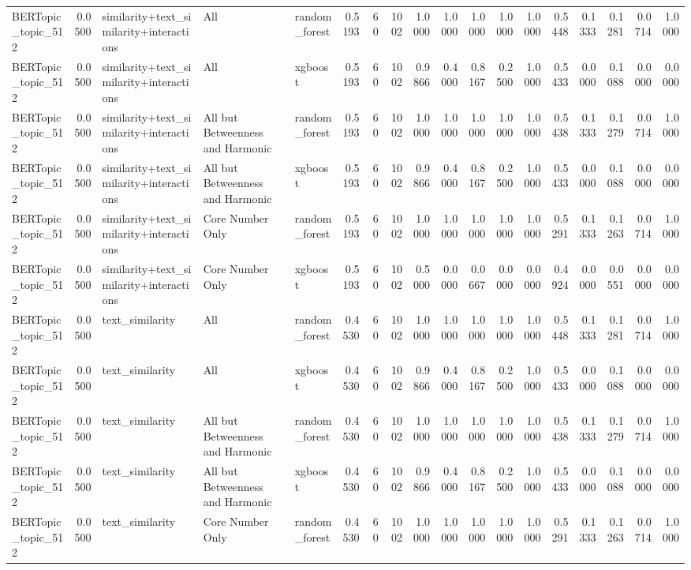 \begin{tabular}{lrlllrrrrrrrrrrrrr}
BERTopic_topic_512 & 0.0500 & similarity+text_similarity+interactions & All & random_forest & 0.5193 & 60 & 1002 & 1.0000 & 1.0000 & 1.0000 & 1.0000 & 1.0000 & 0.5448 & 0.1333 & 0.1281 & 0.0714 & 1.0000 \\
BERTopic_topic_512 & 0.0500 & similarity+text_similarity+interactions & All & xgboost & 0.5193 & 60 & 1002 & 0.9866 & 0.4000 & 0.8167 & 0.2500 & 1.0000 & 0.5433 & 0.0000 & 0.1088 & 0.0000 & 0.0000 \\
BERTopic_topic_512 & 0.0500 & similarity+text_similarity+interactions & All but Betweenness and Harmonic & random_forest & 0.5193 & 60 & 1002 & 1.0000 & 1.0000 & 1.0000 & 1.0000 & 1.0000 & 0.5438 & 0.1333 & 0.1279 & 0.0714 & 1.0000 \\
BERTopic_topic_512 & 0.0500 & similarity+text_similarity+interactions & All but Betweenness and Harmonic & xgboost & 0.5193 & 60 & 1002 & 0.9866 & 0.4000 & 0.8167 & 0.2500 & 1.0000 & 0.5433 & 0.0000 & 0.1088 & 0.0000 & 0.0000 \\
BERTopic_topic_512 & 0.0500 & similarity+text_similarity+interactions & Core Number Only & random_forest & 0.5193 & 60 & 1002 & 1.0000 & 1.0000 & 1.0000 & 1.0000 & 1.0000 & 0.5291 & 0.1333 & 0.1263 & 0.0714 & 1.0000 \\
BERTopic_topic_512 & 0.0500 & similarity+text_similarity+interactions & Core Number Only & xgboost & 0.5193 & 60 & 1002 & 0.5000 & 0.0000 & 0.0667 & 0.0000 & 0.0000 & 0.4924 & 0.0000 & 0.0551 & 0.0000 & 0.0000 \\
BERTopic_topic_512 & 0.0500 & text_similarity & All & random_forest & 0.4530 & 60 & 1002 & 1.0000 & 1.0000 & 1.0000 & 1.0000 & 1.0000 & 0.5448 & 0.1333 & 0.1281 & 0.0714 & 1.0000 \\
BERTopic_topic_512 & 0.0500 & text_similarity & All & xgboost & 0.4530 & 60 & 1002 & 0.9866 & 0.4000 & 0.8167 & 0.2500 & 1.0000 & 0.5433 & 0.0000 & 0.1088 & 0.0000 & 0.0000 \\
BERTopic_topic_512 & 0.0500 & text_similarity & All but Betweenness and Harmonic & random_forest & 0.4530 & 60 & 1002 & 1.0000 & 1.0000 & 1.0000 & 1.0000 & 1.0000 & 0.5438 & 0.1333 & 0.1279 & 0.0714 & 1.0000 \\
BERTopic_topic_512 & 0.0500 & text_similarity & All but Betweenness and Harmonic & xgboost & 0.4530 & 60 & 1002 & 0.9866 & 0.4000 & 0.8167 & 0.2500 & 1.0000 & 0.5433 & 0.0000 & 0.1088 & 0.0000 & 0.0000 \\
BERTopic_topic_512 & 0.0500 & text_similarity & Core Number Only & random_forest & 0.4530 & 60 & 1002 & 1.0000 & 1.0000 & 1.0000 & 1.0000 & 1.0000 & 0.5291 & 0.1333 & 0.1263 & 0.0714 & 1.0000 \\

\end{tabular}
